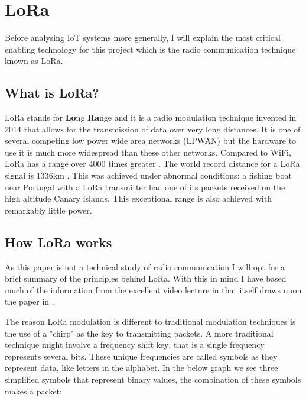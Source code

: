 \section{LoRa}

Before analysing IoT systems more generally, I will explain the most critical
enabling technology for this project which is the radio communication technique
known as LoRa.

\subsection{What is LoRa?}

LoRa stands for \textbf{Lo}ng \textbf{Ra}nge and it is a radio modulation
technique invented in 2014 that allows for the transmission of data over very
long distances. It is one of several competing low power wide area networks
(LPWAN) but the hardware to use it is much more widespread than these other
networks. Compared to WiFi, LoRa has a range over 4000 times greater
\cite{spiess2019}. The world record distance for a LoRa signal is 1336km
\cite{ttn2023}. This was achieved under abnormal conditions: a fishing boat near
Portugal with a LoRa transmitter had one of its packets received on the high
altitude Canary islands. This exceptional range is also achieved with remarkably
little power.

\subsection{How LoRa works}

As this paper is not a technical study of radio communication I will opt for a
brief summary of the principles behind LoRa. With this in mind I have based much
of the information from the excellent video lecture in \cite{visualelectric2021}
that itself draws upon the paper in \cite{vangelista2017}.

The reason LoRa modulation is different to traditional modulation techniques is
the use of a "chirp" as the key to transmitting packets. A more traditional
technique might involve a frequency shift key; that is a single frequency
represents several bits. These unique frequencies are called symbols as they
represent data, like letters in the alphabet. In the below graph we see three
simplified symbols that represent binary values, the combination of these
symbols makes a packet:


